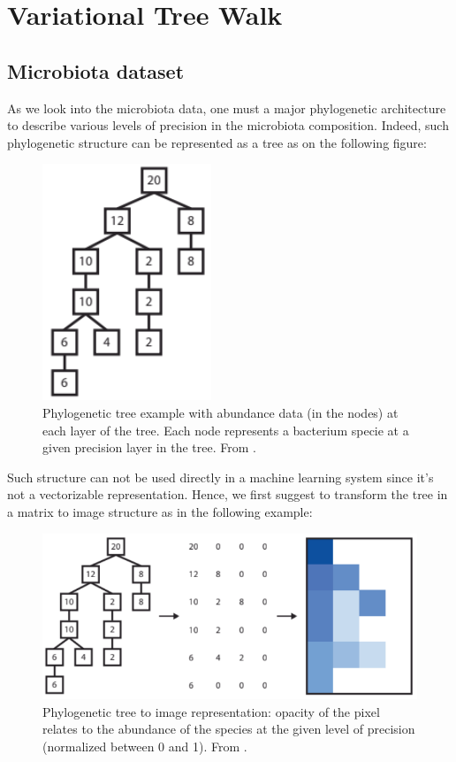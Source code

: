 \section{Variational Tree Walk}

\subsection{Microbiota dataset}

As we look into the microbiota data, one must a major phylogenetic architecture to describe various levels of precision in the microbiota composition.
Indeed, such phylogenetic structure can be represented as a tree as on the following figure:
\begin{figure}[H]
    \center
    \includegraphics[scale=1]{images/abundance_tree_phylogenetic}
    \caption{Phylogenetic tree example with abundance data (in the nodes) at each layer of the tree.
    Each node represents a bacterium specie at a given precision layer in the tree. From \cite{microbiome_deeplearning_research}.}
    \label{fig:phylogenetic_tree}
\end{figure}

Such structure can not be used directly in a machine learning system since it's not a vectorizable representation.
Hence, we first suggest to transform the tree in a matrix to image structure as in the following example:
\begin{figure}[H]
    \center
    \includegraphics[scale=1]{images/tree_to_image}
    \caption{Phylogenetic tree to image representation:
    opacity of the pixel relates to the abundance of the species at the given level of precision (normalized between 0 and 1).
    From \cite{microbiome_deeplearning_research}.}
    \label{fig:phylogenetic_tree_to_img}
\end{figure}

